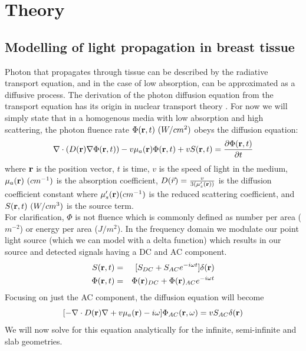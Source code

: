 \chapter{Theory}

\section{Modelling of light propagation in breast tissue}
Photon that propagates through tissue can be described by the radiative transport equation, and in the case of low absorption, can be approximated as a diffusive process. The derivation of the photon diffusion equation from the transport equation has its origin in nuclear transport theory \cite{Case1967}. For now we will simply state that in a homogenous media with low absorption and high scattering, the photon fluence rate
$\Phi({\bf r},t) \ (W/cm^{2})$ obeys the diffusion equation:
\begin{equation}
\label{DEtime}
\nabla\cdot ( D({\bf r}) \nabla \Phi({\bf r},t)) - v\mu_a({\bf r}) \Phi({\bf r},t) + v S({\bf r},t) = \frac{\partial \Phi({\bf r},t)}{\partial t}
\end{equation}
\noindent
where ${\bf r}$ is the position vector, $t$ is time, $v$ is the speed of light in the medium, $\mu_a({\bf r})\ (cm^{-1})$ is the absorption coefficient, $D(\vec{r})=\frac{v}{3(\mu_s^{\prime}({\bf r}))}$ is the diffusion coefficient constant where $\mu_s'({\bf r}) (cm^{-1})$ is the reduced scattering coefficient, and $S({\bf r},t)\ (W/cm^{3})$ is the source term. \\
For clarification, $\Phi$ is not fluence which is commonly defined as number per area ($m^{-2}$) or energy per area ($J/m^{2}$). In the frequency domain we modulate our point light source (which we can model with a delta function) which results in our source and detected signals having a DC and AC component. 
\begin{eqnarray}
\label{AC}
S({\bf r},t) & = & [S_{DC} + S_{AC}e^{-i\omega
  t}]\delta({\bf r}) \\
\Phi({\bf r},t) & = & \Phi({\bf r})_{DC} + \Phi({\bf r})_{AC}e^{-i\omega t}
\end{eqnarray}
\noindent
Focusing on just the AC component, the diffusion equation will become
\begin{equation}
\label{DE}
[-\nabla \cdot D({\bf r}) \nabla + v \mu_a({\bf r})-i\omega]\Phi_{AC}({\bf
  r},\omega)=vS_{AC}\delta({\bf r})
\end{equation}
\noindent
We will now solve for this equation analytically for the infinite, semi-infinite and slab geometries.

